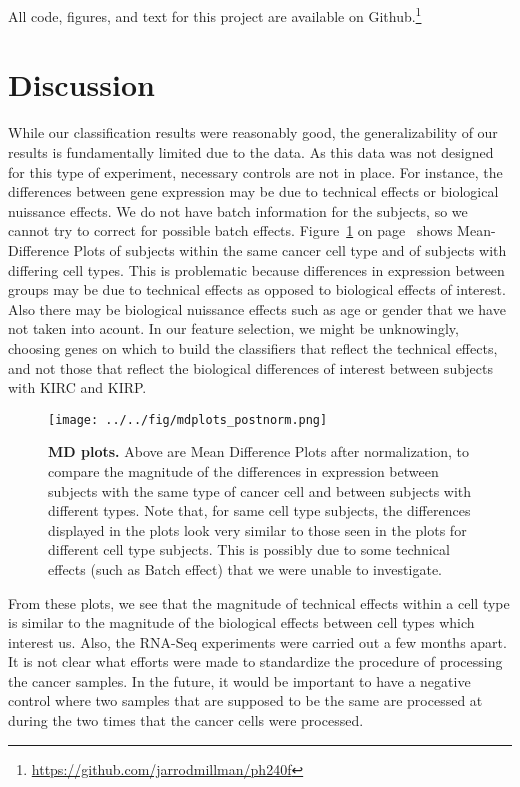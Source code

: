 All code, figures, and text for this project are available on Github.\footnote{\url{https://github.com/jarrodmillman/ph240f}}


\section{Discussion}
While our classification results were reasonably good, the generalizability of our results is fundamentally limited due to the data. As this data was not
designed for this type of experiment, necessary controls are not in place. For
instance, the differences between gene expression may be due to technical
effects or biological nuissance effects. We do not have batch information for the subjects, so we cannot try to
correct for possible batch effects. Figure~\ref{fig:mdplot} on
page~\pageref{fig:mdplot} shows Mean-Difference Plots of subjects within the
same cancer cell type and of subjects with differing cell types.  This is
problematic because differences in expression between groups may be due to
technical effects as opposed to biological effects of interest.  Also there may be biological nuissance effects such as age or gender that we have not taken into acount. In our feature
selection, we might be unknowingly, choosing genes on which to build the
classifiers that reflect the technical effects, and not those that reflect
the biological differences of interest between subjects with KIRC and KIRP.

\begin{figure}[H]
  \centering
    \texttt{[image: ../../fig/mdplots\_postnorm.png]}
\caption{\textbf{MD plots.} Above are Mean Difference Plots after normalization, to
  compare the magnitude of the differences in expression between subjects with
  the same type of cancer cell and between subjects with different types.  Note
  that, for same cell type subjects, the differences displayed in the plots look
  very similar to those seen in the plots for different cell type subjects. This
  is possibly due to some technical effects (such as Batch
  effect) that we were unable to investigate.}
   \label{fig:mdplot}
\end{figure}


From these plots, we see that the magnitude of technical effects within a cell
type is similar to the magnitude of the biological effects between cell types
which interest us. Also, the RNA-Seq experiments were carried out a few months
apart. It is not clear what efforts were made to standardize the procedure of
processing the cancer samples. In the future, it would be important to have a
negative control where two samples that are supposed to be the same are
processed at during the two times that the cancer cells were processed. 

